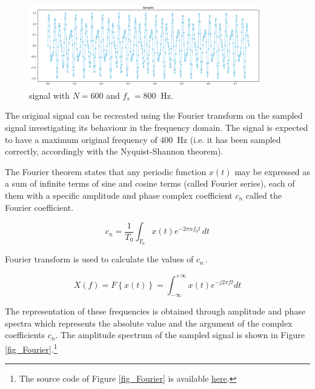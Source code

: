\begin{figure}[hbt!]
\centering
\includegraphics[width=0.9\textwidth]{SectionLetsMath/elemStat_figures/fig_signalsampling.png}
\captionsetup{type=figure}
\caption{signal with $N=600$ and $f_s\ =800\ $ Hz.}
\label{fig_signalsampling}
\end{figure}

The original signal can be recreated using the Fourier transform on the sampled signal investigating its behaviour in the frequency domain. The signal is expected to have a maximum original frequency of 400\ Hz (i.e. it has been sampled correctly, accordingly with the Nyquist-Shannon theorem).\par

The Fourier theorem states that any periodic function $x(t)$ may be expressed as a sum of infinite terms of sine and cosine terms (called Fourier series), each of them with a specific amplitude and phase complex coefficient $c_n$ called the Fourier coefficient. 

\begin{equation}
c_n=\frac{1}{T_0}\int_{T_0}{x\left(t\right)e^{-2\pi n f_0t\ }dt}
\label{eq_FourierCoefficients}
\end{equation}

Fourier transform is used to calculate the values of $c_{n\ }$.

\begin{equation}
X\left(f\right)=F\left\{x\left(t\right)\right\}=\int_{-\infty}^{+\infty}{x\left(t\right)e^{-j2\pi ft}}dt
\label{eq_Fouriertransform}
\end{equation}

The representation of these frequencies is obtained through amplitude and phase spectra which represents the absolute value and the argument of the complex coefficients $c_n$. The amplitude spectrum of the sampled signal is shown in Figure \ref{fig_Fourier}.\footnote{The source code of Figure \ref{fig_Fourier} is available \href{https://github.com/aletuf93/logproj/blob/master/examples/03.\%20Statistics.ipynb}{here}.}

